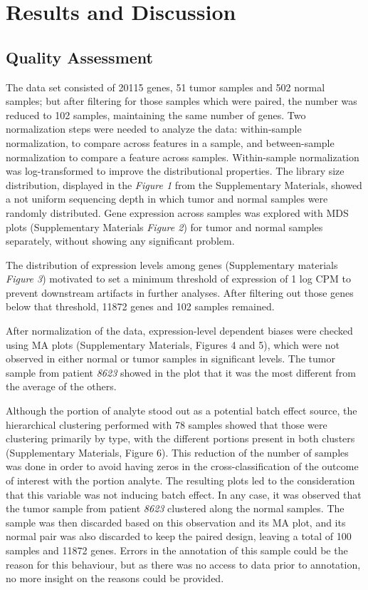 \documentclass[9pt,twocolumn,twoside]{gsajnl}
\begin{document}
\section{Results and Discussion}

\subsection{Quality Assessment}

The data set consisted of 20115 genes, 51 tumor samples and 502 normal samples; but after filtering for those samples which were paired, the number was reduced to 102 samples, maintaining the same number of genes. Two normalization steps were needed to analyze the data: within-sample normalization, to compare across features in a sample, and between-sample normalization to compare a feature across samples. Within-sample normalization was log-transformed to improve the distributional properties. The library size distribution, displayed in the \textit{Figure 1} from the Supplementary Materials, showed a not uniform sequencing depth in which tumor and normal samples were randomly distributed. Gene expression across samples was explored with MDS plots (Supplementary Materials \textit{Figure 2}) for tumor and normal samples separately, without showing any significant problem.

The distribution of expression levels among genes (Supplementary materials \textit{Figure 3}) motivated to set a minimum threshold of expression of 1 log CPM to prevent downstream artifacts in further analyses. After filtering out those genes below that threshold, 11872 genes and 102 samples remained.

After normalization of the data, expression-level dependent biases were checked using MA plots (Supplementary Materials, Figures 4 and 5), which were not observed in either normal or tumor samples in significant levels. The tumor sample from patient \textit{8623} showed in the plot that it was the most different from the average of the others.

Although the portion of analyte stood out as a potential batch effect source, the hierarchical clustering performed with 78 samples showed that those were clustering primarily by type, with the different portions present in both clusters (Supplementary Materials, Figure 6). This reduction of the number of samples was done in order to avoid having zeros in the cross-classification of the outcome of interest with the portion analyte. The resulting plots led to the consideration that this variable was not inducing batch effect. In any case, it was observed that the tumor sample from patient \textit{8623} clustered along the normal samples. The sample was then discarded based on this observation and its MA plot, and its normal pair was also discarded to keep the paired design, leaving a total of 100 samples and 11872 genes. Errors in the annotation of this sample could be the reason for this behaviour, but as there was no access to data prior to annotation, no more insight on the reasons could be provided.
\end{document}
